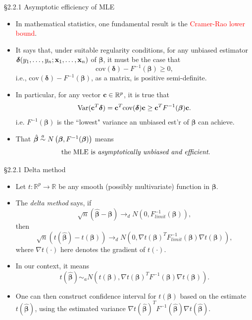 \documentclass{beamer}
\newcommand{\boldbeta}{{\boldsymbol \beta}}
\newcommand{\bolddelta}{{\boldsymbol \delta}}
\newcommand{\bR}{\mathbb{R}}
\begin{document}
\begin{frame}{\S2.2.1 Asymptotic efficiency of MLE}

\begin{itemize}
\item In mathematical statistics, one fundamental result is the \textcolor{red}{Cramer-Rao lower bound}.

\item It says that, under suitable regularity conditions, for any unbiased estimator  $\bolddelta (y_1, \dots, y_n; {\bf x}_1, \dots, {\bf x}_n)$ of $\boldbeta$, it must be the case that
\[
\text{cov}(\bolddelta) - F^{-1} (\boldbeta) \geq 0,
\]
i.e., $\text{cov}(\bolddelta) - F^{-1} (\boldbeta)$, as a matrix, is positive semi-definite.

\item In particular, for any vector ${\bf c} \in \mathbb{R}^p$, it is true that
\[
\text{Var} ({\bf c}^T \bolddelta) = {\bf c}^T \text{cov}(\bolddelta)  {\bf c} \geq  {\bf c}^T  F^{-1} (\boldbeta){\bf c}.
\]
i.e. $F^{-1} (\boldbeta)$ is the ``lowest" variance an unbiased est'r of $\boldbeta$ can achieve. 
\item That $\hat{\boldbeta} \stackrel{a}{\sim} N
\left(\mbox{\boldmath $\beta$}, F^{-1}(\boldbeta)\right)$ means 
\[
\text{ the MLE is \emph{asymptotically unbiased and efficient}.}
\]
\end{itemize}





\end{frame}


\begin{frame} {\S2.2.1  Delta method}

\begin{itemize}

 
\item Let  $t: \mathbb{R}^p \rightarrow \bR$ be any smooth (possibly multivariate) function in  $\boldbeta$.

\item The \emph{delta method} says, if 
\[
\sqrt{n}(\hat{\boldbeta} - \boldbeta) \longrightarrow_d  N(0, F_{limit}^{-1} (\boldbeta)),
\]
then 
\[
\sqrt{n}(t(\hat{\boldbeta}) - t(\boldbeta)) \longrightarrow_d  N( 0,   \nabla t(\boldbeta)^T F_{limit}^{-1} (\boldbeta)  \nabla t(\boldbeta)),
\]
where $\nabla t(\cdot)$ here denotes the gradient of $t(\cdot)$.

\item In our context, it means 
\[
t(\hat{\boldbeta}) \sim_a N(t(\boldbeta) ,   \nabla t(\boldbeta)^T F^{-1}(\boldbeta) \nabla t(\boldbeta)).
\]




\item One can then construct confidence interval for $t(\boldbeta)$ based on the estimate $t(\hat{\boldbeta})$, using the estimated  variance $\nabla t(\hat{\boldbeta})^T F^{-1}(\hat{\boldbeta}) \nabla t(\hat{\boldbeta})$. 

\end{itemize}


\end{frame}
\end{document}
